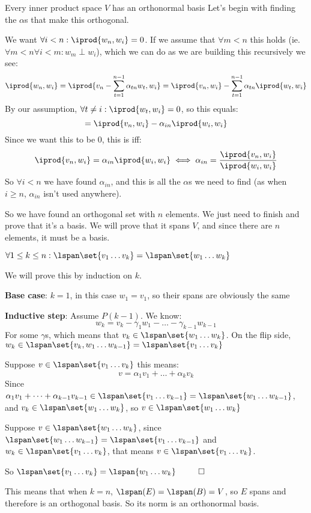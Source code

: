 \documentclass[10pt]{article}
\begin{document}
\begin{theorem}{Every inner product space $V$ has an orthonormal basis}
Let's begin with finding the $\alpha$s that make this orthogonal.

We want $\forall i<n: \iprod{w_n,w_i} = 0$. If we assume that $\forall m<n$ this holds (ie. $\forall m<n \forall i<m: w_m\perp w_i$), which we can do as we are building this recursively we see:
\[ \iprod{w_n, w_i} = \iprod{v_n-\sum_{t=1}^{n-1}\alpha_{tn}w_t, w_i} = \iprod{v_n, w_i} - \sum_{t=1}^{n-1}\alpha_{tn}\iprod{w_t, w_i} \]
By our assumption, $\forall t\neq i: \iprod{w_t,w_i}=0$, so this equals:
\[ = \iprod{v_n,w_i} - \alpha_{in}\iprod{w_i,w_i} \]
Since we want this to be $0$, this is iff:
\[ \iprod{v_n,w_i} = \alpha_{in}\iprod{w_i,w_i} \iff \alpha_{in} = \dfrac{\iprod{v_n,w_i}}{\iprod{w_i,w_i}} \]
So $\forall i<n$ we have found $\alpha_{in}$, and this is all the $\alpha$s we need to find (as when $i\geq n$, $\alpha_{in}$ isn't used anywhere).

So we have found an orthogonal set with $n$ elements. We just need to finish and prove that it's a basis. We will prove that it spans $V$, and since there are $n$ elements, it must be a basis.

\begin{statement}{$\forall 1\leq k\leq n: \lspan\set{v_1\dots v_k}=\lspan\set{w_1\dots w_k}$}

We will prove this by induction on $k$.

\textbf{Base case}: $k=1$, in this case $w_1=v_1$, so their spans are obviously the same

\textbf{Inductive step}: Assume $P(k-1)$. We know:
\[ w_k = v_k - \gamma_1 w_1-\dots-\gamma_{k-1}w_{k-1} \]
For some $\gamma$s, which means that $v_k\in\lspan\set{w_1\dots w_k}$. On the flip side, $w_k\in\lspan\set{v_k,w_1\dots w_{k-1}}=\lspan\set{v_1\dots v_k}$

Suppose $v\in\lspan\set{v_1\dots v_k}$ this means:
\[ v=\alpha_1 v_1+\dots+\alpha_k v_k \]
Since $\alpha_1v_1+\dots+\alpha_{k-1}v_{k-1}\in\lspan\set{v_1\dots v_{k-1}}=\lspan\set{w_1\dots w_{k-1}}$, and $v_k\in\lspan\set{w_1\dots w_k}$, so $v\in\lspan\set{w_1\dots w_k}$

Suppose $v\in\lspan\set{w_1\dots w_k}$, since $\lspan\set{w_1\dots w_{k-1}}=\lspan\set{v_1\dots v_{k-1}}$ and $w_k\in\lspan\set{v_1\dots v_k}$, that means $v\in\lspan\set{v_1\dots v_k}$.

So $\lspan\set{v_1\dots v_k}=\lspan{w_1\dots w_k} ~~ \qed$

\end{statement}

This means that when $k=n$, $\lspan(E)=\lspan(B)=V$, so $E$ spans and therefore is an orthogonal basis. So its norm is an orthonormal basis.

\end{theorem}
\end{document}
